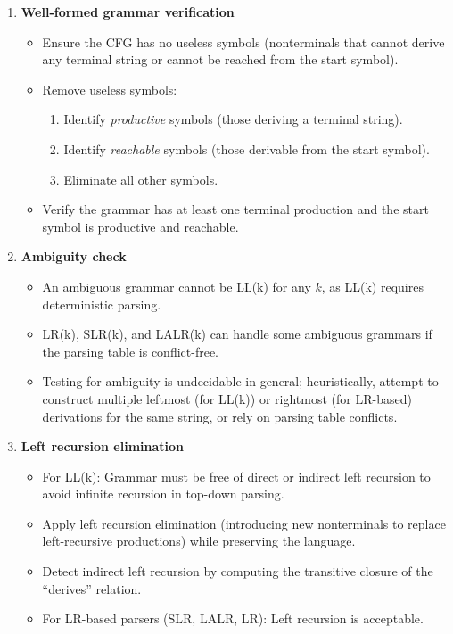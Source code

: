 \begin{enumerate}
    \item \textbf{Well-formed grammar verification}
    \begin{itemize}
        \item Ensure the CFG has no useless symbols (nonterminals that cannot derive any terminal string or cannot be reached from the start symbol).
        \item Remove useless symbols:
        \begin{enumerate}
            \item Identify \emph{productive} symbols (those deriving a terminal string).
            \item Identify \emph{reachable} symbols (those derivable from the start symbol).
            \item Eliminate all other symbols.
        \end{enumerate}
        \item Verify the grammar has at least one terminal production and the start symbol is productive and reachable.
    \end{itemize}

    \item \textbf{Ambiguity check}
    \begin{itemize}
        \item An ambiguous grammar cannot be LL(k) for any \( k \), as LL(k) requires deterministic parsing.
        \item LR(k), SLR(k), and LALR(k) can handle some ambiguous grammars if the parsing table is conflict-free.
        \item Testing for ambiguity is undecidable in general; heuristically, attempt to construct multiple leftmost (for LL(k)) or rightmost (for LR-based) derivations for the same string, or rely on parsing table conflicts.
    \end{itemize}

    \item \textbf{Left recursion elimination}
    \begin{itemize}
        \item For LL(k): Grammar must be free of direct or indirect left recursion to avoid infinite recursion in top-down parsing.
        \item Apply left recursion elimination (introducing new nonterminals to replace left-recursive productions) while preserving the language.
        \item Detect indirect left recursion by computing the transitive closure of the ``derives'' relation.
        \item For LR-based parsers (SLR, LALR, LR): Left recursion is acceptable.
    \end{itemize}
\end{enumerate}

